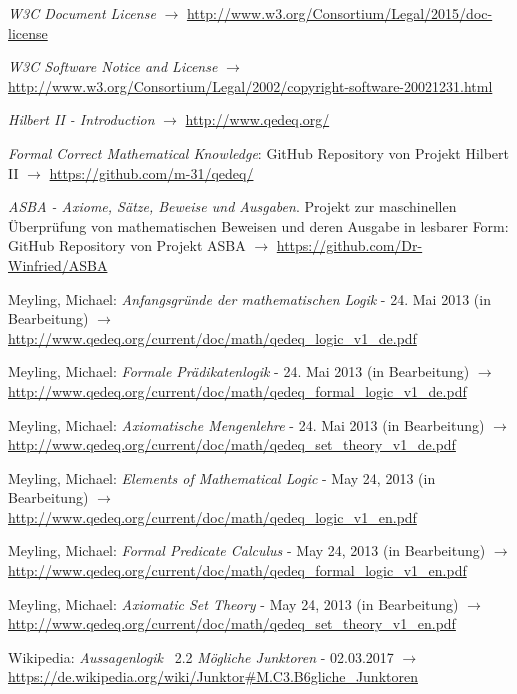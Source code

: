 \documentclass[english,ngerman,parskip=half,headsepline,footsepline]{scrreprt}
\begin{document}
\begin{flushleft}
\begin{thebibliography}{12}
			\emph{W3C Document License} $\rightarrow$ \url{http://www.w3.org/Consortium/Legal/2015/doc-license}

			\emph{W3C Software Notice and License} $\rightarrow$ \url{http://www.w3.org/Consortium/Legal/2002/copyright-software-20021231.html}

			\emph{Hilbert II - Introduction} $\rightarrow$ \url{http://www.qedeq.org/}

			\emph{Formal Correct Mathematical Knowledge}: GitHub Repository von Projekt Hilbert II $\rightarrow$ \url{https://github.com/m-31/qedeq/}

			\emph{ASBA - Axiome, Sätze, Beweise und Ausgaben}. Projekt zur maschinellen Überprüfung von mathematischen Beweisen und deren Ausgabe in lesbarer Form: GitHub Repository von Projekt ASBA $\rightarrow$ \url{https://github.com/Dr-Winfried/ASBA}

			Meyling, Michael: \emph{Anfangsgründe der mathematischen Logik} - 24. Mai 2013 (in Bearbeitung) $\rightarrow$ \url{http://www.qedeq.org/current/doc/math/qedeq_logic_v1_de.pdf}

			Meyling, Michael: \emph{Formale Prädikatenlogik} - 24. Mai 2013 (in Bearbeitung) $\rightarrow$ \url{http://www.qedeq.org/current/doc/math/qedeq_formal_logic_v1_de.pdf}

			Meyling, Michael: \emph{Axiomatische Mengenlehre} - 24. Mai 2013 (in Bearbeitung) $\rightarrow$ \url{http://www.qedeq.org/current/doc/math/qedeq_set_theory_v1_de.pdf}

			Meyling, Michael: \emph{Elements of Mathematical Logic} - May 24, 2013 (in Bearbeitung) $\rightarrow$ \url{http://www.qedeq.org/current/doc/math/qedeq_logic_v1_en.pdf}

			Meyling, Michael: \emph{Formal Predicate Calculus} - May 24, 2013 (in Bearbeitung) $\rightarrow$ \url{http://www.qedeq.org/current/doc/math/qedeq_formal_logic_v1_en.pdf}

			Meyling, Michael: \emph{Axiomatic Set Theory} - May 24, 2013 (in Bearbeitung) $\rightarrow$ \url{http://www.qedeq.org/current/doc/math/qedeq_set_theory_v1_en.pdf}

			Wikipedia: \emph{Aussagenlogik} \chaptername~2.2 \emph{Mögliche Junktoren} - 02.03.2017 $\rightarrow$ \url{https://de.wikipedia.org/wiki/Junktor#M.C3.B6gliche_Junktoren}


\end{thebibliography}
\end{flushleft}
\end{document}
